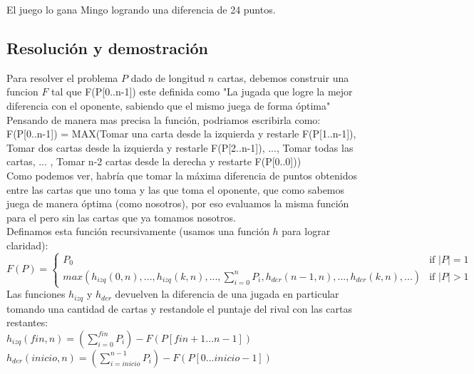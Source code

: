 El juego lo gana Mingo logrando una diferencia de 24 puntos.

\subsection{Resoluci\'on y demostraci\'on}

Para resolver el problema $P$ dado de longitud $n$ cartas, debemos construir una funcion $F$ tal que F(P[0..n-1]) este definida como "La jugada que logre la mejor diferencia con el oponente, sabiendo que el mismo juega de forma \'optima" \\

Pensando de manera mas precisa la funci\'on, podriamos escribirla como: \\

F(P[0..n-1]) = MAX(Tomar una carta desde la izquierda y restarle F(P[1..n-1]), Tomar dos cartas desde la izquierda y restarle F(P[2..n-1]), ..., Tomar todas las cartas, ... , Tomar n-2 cartas desde la derecha y restarte F(P[0..0])) \\

Como podemos ver, habr\'ia que tomar la m\'axima diferencia de puntos obtenidos entre las cartas que uno toma y las que toma el oponente, que como sabemos juega de manera \'optima (como nosotros), por eso evaluamos la misma funci\'on para el pero sin las cartas que ya tomamos nosotros. \\

Definamos esta funci\'on recursivamente (usamos una funci\'on $h$ para lograr claridad): \\

$
F(P) =
\left\{
	\begin{array}{ll}
		P_{0}  & \mbox{if } |P| = 1 \\
		max( h_{izq} (0, n), ... , h_{izq} (k, n) , ... , \sum\limits_{i=0}^n P_{i} , h_{der} (n-1, n), ... , h_{der} (k, n) , ... )  & \mbox{if } |P| > 1
	\end{array}
\right.
$ \\

Las funciones $h_{izq}$ y $h_{der}$ devuelven la diferencia de una jugada en particular tomando una cantidad de cartas y restandole el puntaje del rival con las cartas restantes: \\

$h_{izq}(fin, n) =  (\sum\limits_{i=0}^{fin} P_{i}) - F(P[fin+1...n-1])$ \\
$h_{der}(inicio, n) =  (\sum\limits_{i=inicio}^{n-1} P_{i}) - F(P[0...inicio-1])$\\

